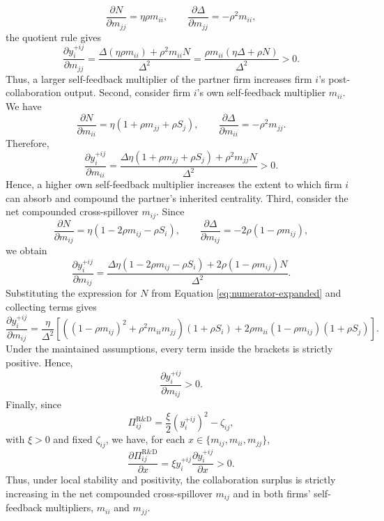 \[
\frac{\partial N}{\partial m_{jj}} = \eta\rho m_{ii}, \qquad \frac{\partial \Delta}{\partial m_{jj}} = -\rho^2m_{ii},
\]
the quotient rule gives
\[
\frac{\partial y_i^{+ij}}{\partial m_{jj}} = \frac{ \Delta(\eta\rho m_{ii}) + \rho^2m_{ii}N }{ \Delta^2 } = \frac{ \rho m_{ii}(\eta\Delta+\rho N) }{ \Delta^2 } > 0.
\]
Thus, a larger self-feedback multiplier of the partner firm increases firm $i$'s post-collaboration output. Second, consider firm $i$'s own self-feedback multiplier $m_{ii}$. We have
\[
\frac{\partial N}{\partial m_{ii}} = \eta(1+\rho m_{jj}+\rho S_j), \qquad \frac{\partial \Delta}{\partial m_{ii}} = -\rho^2m_{jj}.
\]
Therefore,
\[
\frac{\partial y_i^{+ij}}{\partial m_{ii}} = \frac{ \Delta\eta(1+\rho m_{jj}+\rho S_j) + \rho^2m_{jj}N }{ \Delta^2 } > 0.
\]
Hence, a higher own self-feedback multiplier increases the extent to which firm $i$ can absorb and compound the partner's inherited centrality. Third, consider the net compounded cross-spillover $m_{ij}$. Since
\[
\frac{\partial N}{\partial m_{ij}} = \eta(1-2\rho m_{ij}-\rho S_i), \qquad \frac{\partial \Delta}{\partial m_{ij}} = -2\rho(1-\rho m_{ij}),
\]
we obtain
\[
\frac{\partial y_i^{+ij}}{\partial m_{ij}} = \frac{ \Delta\eta(1-2\rho m_{ij}-\rho S_i) + 2\rho(1-\rho m_{ij})N }{ \Delta^2 }.
\]
Substituting the expression for $N$ from Equation \eqref{eq:numerator-expanded} and collecting terms gives
\[
\frac{\partial y_i^{+ij}}{\partial m_{ij}} = \frac{\eta}{\Delta^2} \left[ \left( (1-\rho m_{ij})^2 + \rho^2m_{ii}m_{jj} \right) (1+\rho S_i) + 2\rho m_{ii}(1-\rho m_{ij})(1+\rho S_j) \right].
\]
Under the maintained assumptions, every term inside the brackets is strictly positive. Hence,
\[
\frac{\partial y_i^{+ij}}{\partial m_{ij}} > 0.
\]
Finally, since
\[
\Pi_{ij}^{\mathrm{R\&D}} = \frac{\xi}{2} \left(y_i^{+ij}\right)^2 - \zeta_{ij},
\]
with $\xi>0$ and fixed $\zeta_{ij}$, we have, for each $x\in\{m_{ij},m_{ii},m_{jj}\}$,
\[
\frac{\partial \Pi_{ij}^{\mathrm{R\&D}}}{\partial x} = \xi y_i^{+ij} \frac{\partial y_i^{+ij}}{\partial x} > 0.
\]
Thus, under local stability and positivity, the collaboration surplus is strictly increasing in the net compounded cross-spillover $m_{ij}$ and in both firms' self-feedback multipliers, $m_{ii}$ and $m_{jj}$.

